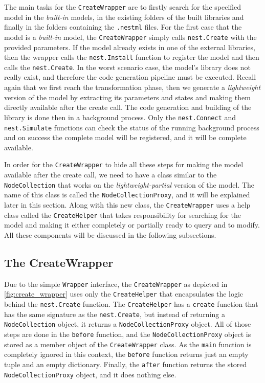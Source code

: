 The main tasks for the \texttt{CreateWrapper} are to firstly search for the specified model in the \emph{built-in} models, in the existing folders of the built libraries and finally in the folders containing the \texttt{.nestml} files. For the first case that the model is a \emph{built-in} model, the \texttt{CreateWrapper} simply calls \texttt{nest.Create} with the provided parameters. If the model already exists in one of the external libraries, then the wrapper calls the \texttt{nest.Install} function to register the model and then calls the \texttt{nest.Create}. In the worst scenario case, the model's library does not really exist, and therefore the code generation pipeline must be executed. Recall again that we first reach the transformation phase, then we generate a \emph{lightweight} version of the model by extracting its parameters and states and making them  directly available after the create call. The code generation and building  of the library is done then in a background process. Only the \texttt{nest.Connect} and \texttt{nest.Simulate} functions can check the status of the running background process and on success the complete model will be registered, and it will be complete available.


In order for the \texttt{CreateWrapper} to hide all these steps for making the model available after the create call, we need to have a class similar to the \texttt{NodeCollection} that works on the \emph{lightweight-partial} version of the model. The name of this class is called the \texttt{NodeCollectionProxy}, and it will be explained later in this section. Along with this new class, the \texttt{CreateWrapper} uses a help class called the \texttt{CreateHelper} that takes responsibility for searching for the model and making it either completely or partially ready to query and to modify. All these components will be discussed in the following subsections.

\subsection{The CreateWrapper}

Due to the simple \texttt{Wrapper} interface, the \texttt{CreateWrapper} as depicted in \autoref{fig:create_wrapper} uses only the \texttt{CreateHelper} that encapsulates the logic behind the \texttt{nest.Create} function. The \texttt{CreateHelper} has a \texttt{create} function that has the same signature as the  \texttt{nest.Create}, but instead of returning a \texttt{NodeCollection} object, it returns a \texttt{NodeCollectionProxy} object. All of those steps are done in the \texttt{before} function, and the \texttt{NodeCollectionProxy} object is stored as a member object of the \texttt{CreateWrapper} class. As the \texttt{main} function is completely ignored in this context, the \texttt{before} function returns just an empty tuple and an empty dictionary. Finally, the \texttt{after} function returns the stored \texttt{NodeCollectionProxy} object, and it does nothing else.

